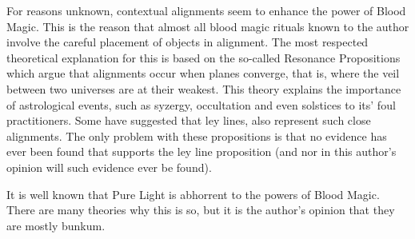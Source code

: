 \documentclass[a4paper]{article}
\begin{document}
For reasons unknown, contextual alignments seem to enhance the power of Blood Magic.  This is the reason that almost all blood magic rituals known to the author involve the careful placement of objects in alignment.   The most respected theoretical explanation for this is based on the so-called Resonance Propositions which argue that alignments occur when planes converge, that is, where the veil between two universes are at their weakest.  This theory explains the importance of astrological events, such as syzergy, occultation and even solstices to its' foul practitioners.  Some have suggested that ley lines, also represent such close alignments.  The only problem with these propositions is that no evidence has ever been found that supports the ley line proposition (and nor in this author's opinion will such evidence ever be found).

It is well known that Pure Light is abhorrent to the powers of Blood Magic.  There are many theories why this is so, but it is the author's opinion that they are mostly bunkum.
\end{document}
